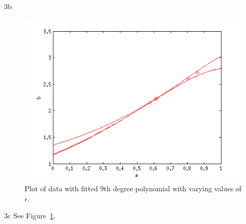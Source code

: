 \documentclass{article}
\begin{document}
\begin{homeworkProblem}
\begin{homeworkSection}{3b}
        \begin{figure}[!ht]
        \begin{centering}
            \includegraphics[scale=1]{problem3c_fig.png}

            \caption{\label{fig:3b} Plot of data with fitted 9th degree
            polynomial with varying values of $\epsilon$.}

        \end{centering}
        \end{figure}

    \end{homeworkSection}

    \begin{homeworkSection}{3c}
        See Figure~\ref{fig:3b}.
    \end{homeworkSection}

\end{homeworkProblem}
\end{document}
